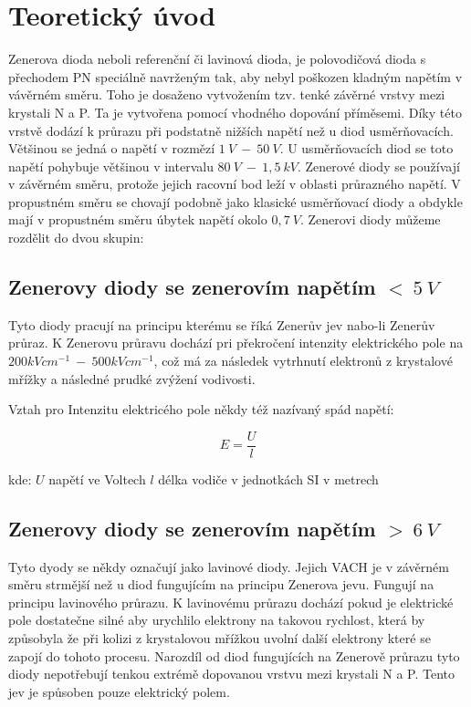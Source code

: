 \section{Teoretický úvod}
  \indent\indent
  Zenerova dioda neboli referenční či lavinová dioda, je polovodičová dioda s přechodem PN speciálně navrženým tak, aby nebyl poškozen kladným napětím v vávěrném směru. Toho je dosaženo vytvožením tzv. tenké závěrné vrstvy mezi krystali N a P. Ta je vytvořena pomocí vhodného dopování příměsemi. Díky této vrstvě dodází k průrazu při podstatně nižších napětí než u diod usměrňovacích. Většinou se jedná o napětí v rozmězí $1~V~-~50~V$. U usměrňovacích diod se toto napětí pohybuje většinou v intervalu $80~V~-~1,5~kV$. Zenerové diody se používají v závěrném směru, protože jejich racovní bod leží v oblasti průrazného napětí. V propustném směru se chovají podobně jako klasické usměrňovací diody a obdykle mají v propustném směru úbytek napětí okolo $0,7~V$. Zenerovi diody můžeme rozdělit do dvou skupin:
  
  \subsection{Zenerovy diody se zenerovím napětím $<~5~V$}
    \indent\indent
    Tyto diody pracují na principu kterému se říká Zenerův jev nabo-li Zenerův průraz. K Zenerovu průravu dochází pri překročení intenzity elektrického pole na $200kVcm^{-1}~-~500kVcm^{-1}$, což má za následek vytrhnutí elektronů z krystalové mřížky a následné prudké zvýžení vodivosti.
    
    Vztah pro Intenzitu elektricého pole někdy též nazívaný spád napětí:
  
    \begin{equation}
      E = \frac{U}{l}
    \end{equation}
    
    \hspace*{2cm}kde:\newline    
    \hspace*{4cm}$U$ \dotfill napětí ve Voltech\hspace*{4cm}\newline
    \hspace*{4cm}$l$ \dotfill délka vodiče v jednotkách SI v metrech\hspace*{4cm}\newline
    
  \subsection{Zenerovy diody se zenerovím napětím $>~6~V$}
    \indent\indent
    Tyto dyody se někdy označují jako lavinové diody. Jejich VACH je v závěrném směru strmější než u diod fungujícím na principu Zenerova jevu. Fungují na principu lavinového průrazu. K lavinovému průrazu dochází pokud je elektrické pole dostatečne silné aby urychlilo elektrony na takovou rychlost, která by způsobyla že při kolizi z krystalovou mřížkou uvolní další elektrony které se zapojí do tohoto procesu. Narozdíl od diod fungujících na Zenerově průrazu tyto diody nepotřebují tenkou extrémě dopovanou vrstvu mezi krystali N a P. Tento jev je spůsoben pouze elektrický polem.
   
